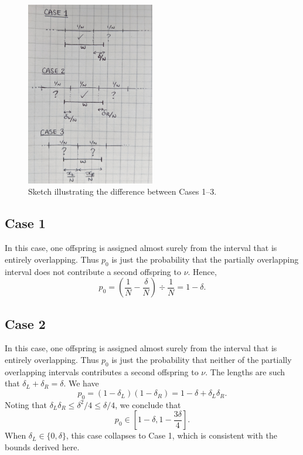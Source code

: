 \documentclass[fleqn]{article}
\begin{document}
\begin{figure}[ht]
\centering
\includegraphics[width=0.5\textwidth]{cases_sketch.jpg}
\caption{Sketch illustrating the difference between Cases 1--3.}
\label{fig:cases}
\end{figure}

\subsection*{Case 1}
In this case, one offspring is assigned almost surely from the interval that is entirely overlapping. Thus $p_0$ is just the probability that the partially overlapping interval does not contribute a second offspring to $\nu$.
Hence,
\begin{equation}
p_0 
= \left( \frac{1}{N} - \frac{\delta}{N} \right) \div \frac{1}{N}
= 1-\delta .
\end{equation}

\subsection*{Case 2}
In this case, one offspring is assigned almost surely from the interval that is entirely overlapping. Thus $p_0$ is just the probability that neither of the partially overlapping intervals contributes a second offspring to $\nu$. 
The lengths are such that $\delta_L + \delta_R = \delta$.
We have
\begin{equation}
p_0 
= (1- \delta_L)(1- \delta_R)
= 1- \delta + \delta_L \delta_R .
\end{equation}
Noting that $\delta_L \delta_R \leq \delta^2/4 \leq \delta/4$, we conclude that
\begin{equation}
p_0 \in \left[ 1-\delta, 1- \frac{3\delta}{4} \right] .
\end{equation}
When $\delta_L \in \{0, \delta \}$, this case collapses to Case 1, which is consistent with the bounds derived here.
\end{document}
